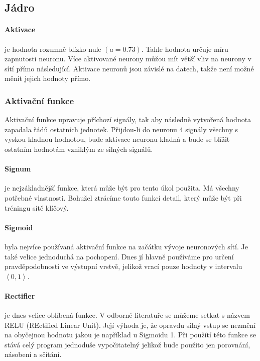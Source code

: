 \documentclass[12pt,a4paper]{report}
\begin{document}
	\subsection{Jádro}
		\paragraph{Aktivace}
		je hodnota rozumně blízko nule $(a=0.73)$. Tahle hodnota určuje míru zapnutosti neuronu. Více aktivované neurony můžou mít větší vliv na neurony v sítí přímo následující. Aktivace neuronů jsou závislé na datech, takže není možné měnit jejich hodnoty přímo.
		\subsubsection{Aktivační funkce}
		Aktivační funkce upravuje příchozí signály, tak aby následně vytvořená hodnota zapadala řádů ostatních jednotek. Přijdou-li do neuronu 4 signály všechny s vyskou kladnou hodnotou, bude aktivace neuronu kladná a bude se blížit ostatním hodnotám vzniklým ze silných signálů.
		\paragraph{Signum}
		je nejzákladnější funkce, která může být pro tento úkol použita. Má všechny potřebné vlastnosti. Bohužel ztrácíme touto funkcí detail, který může být při tréningu sítě klíčový.
		\paragraph{Sigmoid}
		byla nejvíce používaná aktivační funkce na začátku vývoje neuronových sítí. Je také velice jednoduchá na pochopení. Dnes jí hlavně používáme pro určení pravděpodobností ve výstupní vrstvě, jelikož vrací pouze hodnoty v intervalu $\left<0,1\right>$.
		\paragraph{Rectifier}
		je dnes velice oblíbená funkce. V odborné literatuře se můžeme setkat s názvem RELU (REctified Linear Unit). Její výhoda je, že opravdu silný vstup se nezmění na obyčejnou hodnotu jakou je například u Sigmoidu 1. Při použítí této funkce se stává celý program jednoduše vypočitatelný jelikož bude použito jen porovnání, násobení a sčítání.
\end{document}

